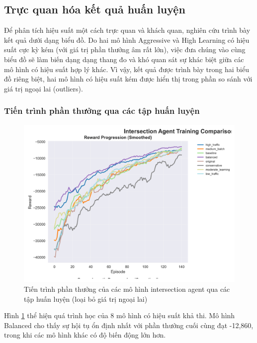\subsection{Trực quan hóa kết quả huấn luyện}

Để phân tích hiệu suất một cách trực quan và khách quan, nghiên cứu trình bày
kết quả dưới dạng biểu đồ. Do hai mô hình Aggressive và High Learning có hiệu suất cực kỳ kém (với giá trị phần thưởng âm rất lớn), việc đưa chúng vào cùng biểu đồ sẽ làm biến dạng dạng thang đo và khó quan sát sự khác biệt giữa các mô hình có hiệu suất hợp lý khác. Vì vậy, kết quả được trình bày trong hai biểu đồ riêng biệt, hai mô hình có hiệu suất kém được hiển thị trong phần so sánh với giá trị ngoại lai (outliers).

\subsubsection{Tiến trình phần thưởng qua các tập huấn luyện}

\begin{figure}[!htp]
    \centering
    \includegraphics[width=\textwidth]{
        figures/individual_plots/intersection_filtered_reward_progress.png
    }
    \caption{Tiến trình phần thưởng của các mô hình intersection agent qua các
    tập huấn luyện (loại bỏ giá trị ngoại lai)}
    \label{fig:intersection_filtered_reward_progress}
\end{figure}

Hình \ref{fig:intersection_filtered_reward_progress} thể hiện quá trình học của
8 mô hình có hiệu suất khả thi. Mô hình Balanced cho thấy sự hội tụ ổn định nhất
với phần thưởng cuối cùng đạt -12,860, trong khi các mô hình khác có độ biến động lớn
hơn.

